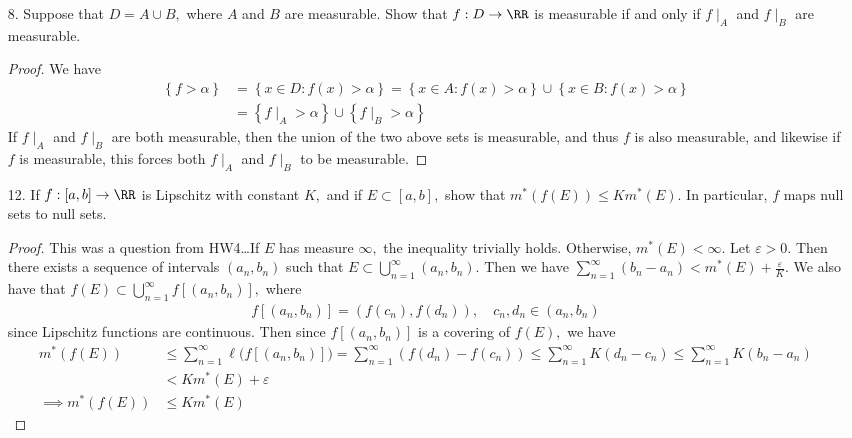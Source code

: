 \documentclass{article}
\begin{document}
\begin{itemize}
\begin{proof}
			Now, we have $f(x)=x$ whenever $x\in N,$ and $f(x)=0$ otherwise, so
			\begin{align*}
				\left\{ f=\alpha \right\} &= \begin{cases}
					\left\{ \alpha \right\} & \alpha \in N \\
					\varnothing & \alpha\in\RR\setminus (N\cup \left\{ 0 \right\})
				\end{cases}
			\end{align*}
			which are both measurable sets. However, it seems like the case when $\alpha=0$ is not measurable\ldots
		\end{proof}

	\item[8.] Suppose that $D=A\cup B,$ where $A$ and $B$ are measurable. Show that $f:D\to\RR$ is measurable if and only if $f\mid_A$ and $f\mid_B$ are measurable.
		\begin{proof}
			We have
			\begin{align*}
				\left\{ f>\alpha \right\} &= \left\{ x\in D: f(x)>\alpha \right\} = \left\{ x\in A:f(x)>\alpha \right\} \cup \left\{ x\in B: f(x)>\alpha \right\} \\
				&= \left\{ f\mid_A>\alpha \right\} \cup \left\{ f\mid_B>\alpha \right\}
			\end{align*}
			If $f\mid_A$ and $f\mid_B$ are both measurable, then the union of the two above sets is measurable, and thus $f$ is also measurable, and likewise if $f$ is measurable, this forces both $f\mid_A$ and $f\mid_B$ to be measurable.
		\end{proof}

	\item[12.] If $f:[a, b]\to\RR$ is Lipschitz with constant $K,$ and if $E\subset [a, b],$ show that $m^*(f(E))\le Km^*(E).$ In particular, $f$ maps null sets to null sets.
		\begin{proof}
			This was a question from HW4\ldots If $E$ has measure $\infty,$ the inequality trivially holds. Otherwise, $m^*(E)<\infty.$ Let $\varepsilon>0.$ Then there exists a sequence of intervals $(a_n, b_n)$ such that $E\subset \bigcup_{n=1}^\infty (a_n, b_n).$ Then we have $\sum_{n=1}^{\infty} (b_n-a_n) < m^*(E) + \frac{\varepsilon}{K}.$ We also have that $f(E) \subset \bigcup_{n=1}^\infty f\left[ (a_n, b_n) \right],$ where
			\begin{align*}
				f[(a_n, b_n)] = (f(c_n), f(d_n)), \quad c_n, d_n\in (a_n, b_n)
			\end{align*}
			since Lipschitz functions are continuous. Then since $f[(a_n, b_n)]$ is a covering of $f(E),$ we have
			\begin{align*}
				m^*(f(E)) &\le \sum_{n=1}^{\infty}\ell\bigg(f[(a_n, b_n)]\bigg) = \sum_{n=1}^{\infty} (f(d_n)-f(c_n))\le \sum_{n=1}^{\infty} K(d_n-c_n)\le \sum_{n=1}^{\infty} K(b_n-a_n) \\
				&< Km^*(E) + \varepsilon \\ 
				\implies m^*(f(E)) &\le Km^*(E)
			\end{align*}


\end{proof}
\end{itemize}
\end{document}
